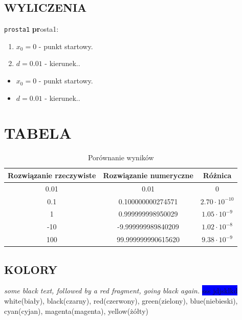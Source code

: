 \documentclass[11pt,a4paper]{article}
\begin{document}
	
	
	

\subsection*{WYLICZENIA}
\texttt{prosta1} \textbf{pr}osta1:
\begin{enumerate}
	\item $x_{0}=0$ - punkt startowy.
	\item $d=0.01$ - kierunek..
\end{enumerate}
\begin{itemize}
	\item $x_{0}=0$ - punkt startowy.
	\item $d=0.01$ - kierunek..
\end{itemize}
\newpage
\section*{TABELA}
\begin{table}[h]
	\centering
	\caption{Porównanie wyników}
	\begin{tabular}{|c|c|c|}
		\hline
		Rozwiązanie rzeczywiste & Rozwiązanie numeryczne  & Różnica\\
		\hline
		0.01    &  0.01  & 0\\
		\hline
		0.1  &  0.100000000274571  & $2.70\cdot10^{-10}$\\
		\hline
		1  &  0.999999998950029  & $1.05\cdot10^{-9} $\\
		\hline
		-10  &  -9.999999989840209  & $1.02\cdot10^{-8} $\\
		\hline
		100  &  99.999999990615620  & $9.38\cdot10^{-9} $\\
		\hline		
		\end{tabular}
\end{table}

\subsection*{KOLORY}
\emph{some black text, {\color{red}followed by a red fragment}, going black again.}
\colorbox{blue}{sss jdjsklkd}
white(biały), black(czarny), red(czerwony), green(zielony), blue(niebieski), cyan(cyjan), magenta(magenta), yellow(żółty)
\end{document}
